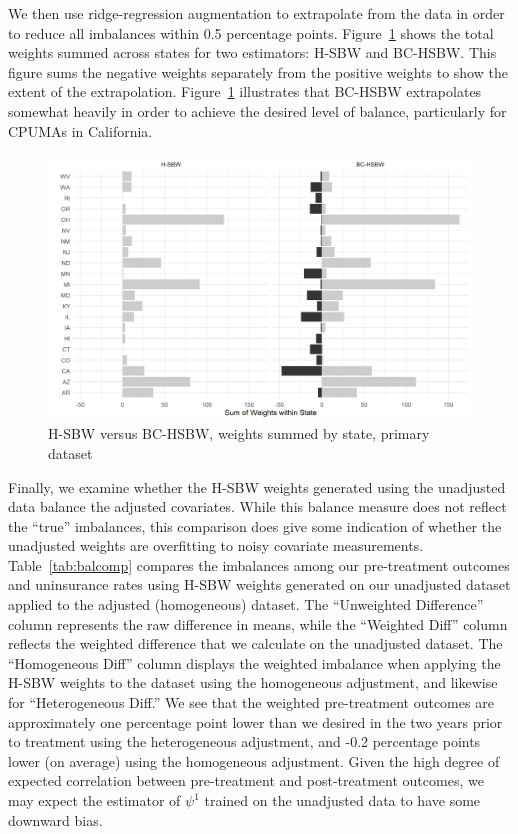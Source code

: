 \documentclass[article]{imsart}
\theoremstyle{plain}
\theoremstyle{remark}
\begin{document}
We then use ridge-regression augmentation to extrapolate from the data in order to reduce all imbalances within 0.5 percentage points. Figure~\ref{fig:statewghts} shows the total weights summed across states for two estimators: H-SBW and BC-HSBW. This figure sums the negative weights separately from the positive weights to show the extent of the extrapolation. Figure~\ref{fig:statewghts} illustrates that BC-HSBW extrapolates somewhat heavily in order to achieve the desired level of balance, particularly for CPUMAs in California. 

\begin{figure}[H]
\begin{center}
    \caption{H-SBW versus BC-HSBW, weights summed by state, primary dataset}
    \label{fig:statewghts}
    \includegraphics[scale=0.6]{01_Plots/weights-by-state-hsbw-c1.png}
\end{center}
\end{figure}

Finally, we examine whether the H-SBW weights generated using the unadjusted data balance the adjusted covariates. While this balance measure does not reflect the ``true'' imbalances, this comparison does give some indication of whether the unadjusted weights are overfitting to noisy covariate measurements. Table~\ref{tab:balcomp} compares the imbalances among our pre-treatment outcomes and uninsurance rates using H-SBW weights generated on our unadjusted dataset applied to the adjusted (homogeneous) dataset. The ``Unweighted Difference'' column represents the raw difference in means, while the ``Weighted Diff'' column reflects the weighted difference that we calculate on the unadjusted dataset. The ``Homogeneous Diff'' column displays the weighted imbalance when applying the H-SBW weights to the dataset using the homogeneous adjustment, and likewise for ``Heterogeneous Diff.'' We see that the weighted pre-treatment outcomes are approximately one percentage point lower than we desired in the two years prior to treatment using the heterogeneous adjustment, and -0.2 percentage points lower (on average) using the homogeneous adjustment. Given the high degree of expected correlation between pre-treatment and post-treatment outcomes, we may expect the estimator of $\psi^1$ trained on the unadjusted data to have some downward bias.
\end{document}
